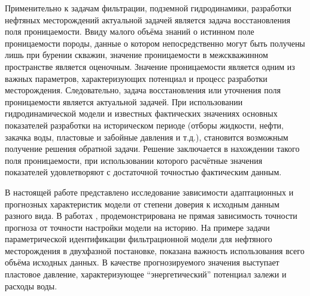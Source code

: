 \documentclass{article}
\begin{document}
	Применительно к задачам фильтрации, подземной гидродинамики, разработки нефтяных месторождений актуальной задачей является задача восстановления поля проницаемости. Ввиду малого объёма знаний о истинном поле проницаемости породы, данные о котором непосредственно могут быть получены лишь при бурении скважин, значение проницаемости в межскважинном пространстве является оценочным. Значение проницаемости является одним из  важных параметров, характеризующих потенциал и процесс разработки месторождения. Следовательно, задача восстановления или уточнения поля проницаемости является актуальной задачей. При использовании гидродинамической модели и известных фактических значениях основных показателей разработки на историческом периоде (отборы жидкости, нефти, закачка воды, пластовые и забойные давления и т.д.), становится возможным получение решения обратной задачи. Решение заключается в нахождении такого поля проницаемости, при использовании которого расчётные значения показателей удовлетворяют с достаточной точностью фактическим данным.

	В настоящей работе представлено исследование зависимости адаптационных и прогнозных характеристик модели от степени доверия к исходным данным разного вида. В работах \cite{mus}, \cite{kos} продемонстрирована не прямая зависимость точности прогноза от точности настройки модели на историю. На примере задачи параметрической идентификации фильтрационной модели для нефтяного месторождения в двухфазной постановке, показана важность использования всего объёма исходных данных. В качестве прогнозируемого значения выступает пластовое давление, характеризующее “энергетический” потенциал залежи и расходы воды.
\end{document}
